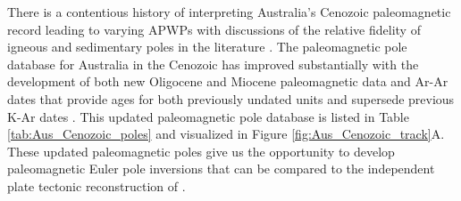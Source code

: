 \documentclass[11pt,letterpaper]{article}
\begin{document}
There is a contentious history of interpreting Australia's Cenozoic paleomagnetic record leading to varying APWPs with discussions of the relative fidelity of igneous and sedimentary poles in the literature \cite[e.g.]{Idnurm1985a, Musgrave1989a, Idnurm1994a,Hansma2019a}. The paleomagnetic pole database for Australia in the Cenozoic has improved substantially with the development of both new Oligocene and Miocene paleomagnetic data \citep{Hansma2018a, Hansma2019a} and Ar-Ar dates that provide ages for both previously undated units and supersede previous K-Ar dates \citep{Cohen2008a,Knesel2008a,Cohen2013a}. This updated paleomagnetic pole database is listed in Table \ref{tab:Aus_Cenozoic_poles} and visualized in Figure \ref{fig:Aus_Cenozoic_track}A. These updated paleomagnetic poles give us the opportunity to develop paleomagnetic Euler pole inversions that can be compared to the independent plate tectonic reconstruction of \cite{Muller2016a}. 
\end{document}
